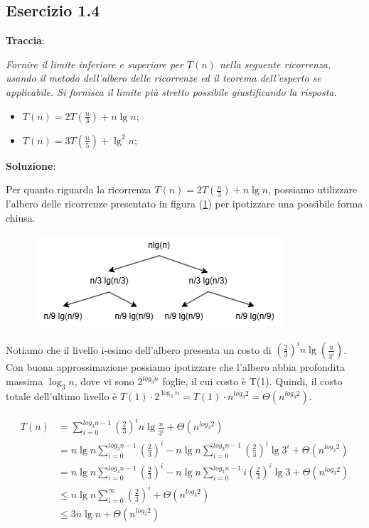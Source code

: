 \documentclass{article}
\begin{document}
\subsection{Esercizio 1.4} \label{subsec:esercizio1_4}
\textbf{Traccia}:

\noindent
\textit{Fornire il limite inferiore e superiore per $T(n)$ nella seguente ricorrenza, usando il metodo dell'albero delle ricorrenze ed il teorema dell'esperto se applicabile. Si fornisca il limite più stretto possibile giustificando la risposta.} 
\begin{itemize}
    \item $T(n) = 2T(\frac{n}{3}) + n\lg n$;
    \item $T(n) = 3T(\frac{n}{5}) + \lg^2 n$;
\end{itemize}

\vspace{\baselineskip}
\noindent
\textbf{Soluzione}: 

\noindent
Per quanto riguarda la ricorrenza $T(n) = 2T(\frac{n}{3}) + n\lg n$, possiamo utilizzare l'albero delle ricorrenze presentato in figura (\ref{fig:recurrence_tree_1}) per ipotizzare una possibile forma chiusa. 

\begin{figure}[ht]
    \centering
    \includegraphics[width=.5\textwidth]{img/recurrence_tree_1.png}
    \label{fig:recurrence_tree_1}
\end{figure}

\noindent
Notiamo che il livello i-esimo dell'albero presenta un costo di $\left(\frac{2}{3}\right)^i n \lg \left(\frac{n}{3^i}\right)$. Con buona approssimazione possiamo ipotizzare che l'albero abbia profondita massima $\log_3 n$, dove vi sono $2^{log_{3}n}$ foglie, il cui costo è T(1). Quindi, il costo totale dell'ultimo livello è $T(1)\cdot 2^{\log_{3}{n}} = T(1)\cdot n^{log_{3}{2}} = \Theta(n^{log_{3} {2}})$.


\begin{equation} \label{eq:proof_1_4_1_1}
\begin{aligned}
T(n) & = \sum_{i=0}^{log_{3}{n} -1 } \left(\frac{2}{3}\right)^i n \lg{\frac{n}{3^i}} + \Theta(n^{log_{3}{2}}) \\
& = n \lg{n} \sum_{i=0}^{log_{3}{n} -1 }\left(\frac{2}{3}\right)^i - n \lg{n} \sum_{i=0}^{log_{3}{n} -1 }\left(\frac{2}{3}\right)^i \lg{3^i} + \Theta(n^{log_{3}{2}}) \\
& = n \lg{n} \sum_{i=0}^{log_{3}{n} -1 }\left(\frac{2}{3}\right)^i - n \lg{n} \sum_{i=0}^{log_{3}{n} -1 }i\left(\frac{2}{3}\right)^i \lg{3} + \Theta(n^{log_{3}{2}}) \\
& \le n \lg{n} \sum_{i=0}^{\infty}\left(\frac{2}{3}\right)^i + \Theta(n^{log_{3}{2}}) \\
& \le 3 n \lg{n}  + \Theta(n^{log_{3}{2}})
\end{aligned}
\end{equation}
\end{document}
